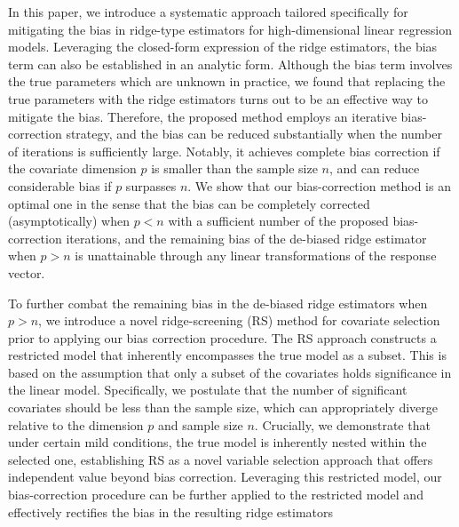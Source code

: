 In this paper, we introduce a systematic approach tailored specifically for mitigating the bias in ridge-type estimators for high-dimensional linear regression models. Leveraging the closed-form expression of the ridge estimators, the bias term can also be established in an analytic form. Although the bias term involves the true parameters which are unknown in practice, we found that replacing the true parameters with the ridge estimators  turns out to be an effective way to mitigate the bias.
Therefore, the proposed method employs an iterative bias-correction strategy, and the bias can be reduced substantially when the number of iterations is sufficiently large.
 Notably, it achieves complete bias correction if the covariate dimension $p$ is smaller than the sample size $n$, and can reduce considerable bias if $p$ surpasses $n$. We show that our bias-correction method is an optimal one in the sense that the bias can be completely corrected (asymptotically) when $p< n$ with a sufficient number of the proposed bias-correction iterations, and the remaining bias of the de-biased ridge estimator  when $p>n$ is unattainable through any linear transformations of the response vector.

To further combat the remaining bias in the de-biased ridge estimators when $p>n$, we introduce a novel ridge-screening (RS) method for covariate selection prior to applying our bias correction procedure. The RS approach constructs a restricted model that inherently encompasses the true model as a subset. This is based on the assumption that only a subset of the covariates holds significance in the linear model. Specifically, we postulate that the number of significant covariates should be less than the sample size, which can appropriately diverge relative to the dimension 
$p$ and sample size 
$n$. Crucially, we demonstrate that under certain mild conditions, the true model is inherently nested within the selected one, establishing RS as a novel variable selection approach that offers independent value beyond bias correction. Leveraging this restricted model, our bias-correction procedure can be further applied to the restricted model and effectively rectifies the bias in the resulting ridge estimators



